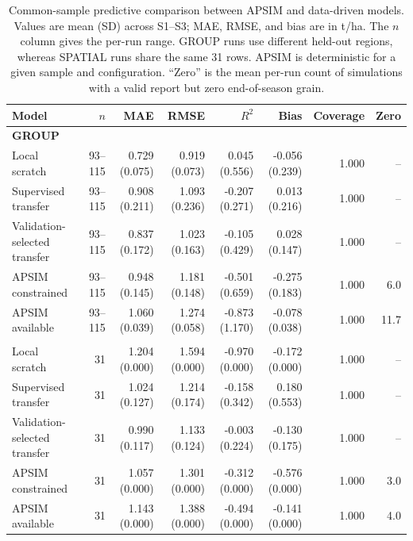 \begin{landscape}
\begin{table}[tb]
\centering
\caption{Common-sample predictive comparison between APSIM and data-driven models. Values are mean (SD) across S1--S3; MAE, RMSE, and bias are in t/ha. The $n$ column gives the per-run range. GROUP runs use different held-out regions, whereas SPATIAL runs share the same 31 rows. APSIM is deterministic for a given sample and configuration. ``Zero'' is the mean per-run count of simulations with a valid report but zero end-of-season grain.}
\label{tab:apsim-comparison}
\small
\setlength{\tabcolsep}{2.6pt}
\begin{tabular}{lrrrrrrr}
\toprule
Model & $n$ & MAE & RMSE & $R^2$ & Bias & Coverage & Zero\\
\midrule
\multicolumn{8}{l}{\textbf{GROUP}}\\
Local scratch & 93--115 & 0.729 (0.075) & 0.919 (0.073) & 0.045 (0.556) & -0.056 (0.239) & 1.000 & --\\
Supervised transfer & 93--115 & 0.908 (0.211) & 1.093 (0.236) & -0.207 (0.271) & 0.013 (0.216) & 1.000 & --\\
Validation-selected transfer & 93--115 & 0.837 (0.172) & 1.023 (0.163) & -0.105 (0.429) & 0.028 (0.147) & 1.000 & --\\
APSIM constrained & 93--115 & 0.948 (0.145) & 1.181 (0.148) & -0.501 (0.659) & -0.275 (0.183) & 1.000 & 6.0\\
APSIM available & 93--115 & 1.060 (0.039) & 1.274 (0.058) & -0.873 (1.170) & -0.078 (0.038) & 1.000 & 11.7\\
\addlinespace
\multicolumn{8}{l}{\textbf{SPATIAL}}\\
Local scratch & 31 & 1.204 (0.000) & 1.594 (0.000) & -0.970 (0.000) & -0.172 (0.000) & 1.000 & --\\
Supervised transfer & 31 & 1.024 (0.127) & 1.214 (0.174) & -0.158 (0.342) & 0.180 (0.553) & 1.000 & --\\
Validation-selected transfer & 31 & 0.990 (0.117) & 1.133 (0.124) & -0.003 (0.224) & -0.130 (0.175) & 1.000 & --\\
APSIM constrained & 31 & 1.057 (0.000) & 1.301 (0.000) & -0.312 (0.000) & -0.576 (0.000) & 1.000 & 3.0\\
APSIM available & 31 & 1.143 (0.000) & 1.388 (0.000) & -0.494 (0.000) & -0.141 (0.000) & 1.000 & 4.0\\
\bottomrule
\end{tabular}
\end{table}
\end{landscape}
